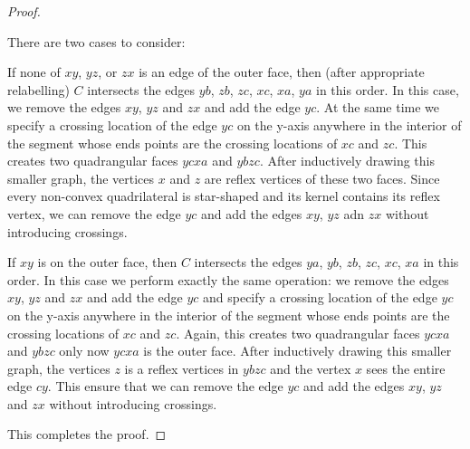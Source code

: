 \documentclass{patmorin}
\begin{document}
\begin{proof}
\begin{enumerate}
        There are two cases to consider: 

        If none of $xy$, $yz$, or $zx$ is an edge of the outer face,
        then (after appropriate relabelling) $C$ intersects the edges
        $yb$, $zb$, $zc$, $xc$, $xa$, $ya$ in this order.  In this case,
        we remove the edges $xy$, $yz$ and $zx$ and add the edge $yc$.
        At the same time we specify a crossing location of the edge
        $yc$ on the y-axis anywhere in the interior of the segment
        whose ends points are the crossing locations of $xc$ and $zc$.
        This creates two quadrangular faces $ycxa$ and $ybzc$.  After
        inductively drawing this smaller graph, the vertices $x$ and $z$
        are reflex vertices of these two faces.  Since every non-convex
        quadrilateral is star-shaped and its kernel contains its reflex
        vertex, we can remove the edge $yc$ and add the edges $xy$, $yz$
        adn $zx$ without introducing crossings.

        If $xy$ is on the outer face, then $C$ intersects the edges
        $ya$, $yb$, $zb$, $zc$, $xc$, $xa$ in this order. In this
        case we perform exactly the same operation:  we remove the
        edges $xy$, $yz$ and $zx$ and add the edge $yc$ and specify a
        crossing location of the edge $yc$ on the y-axis anywhere in
        the interior of the segment whose ends points are the crossing
        locations of $xc$ and $zc$.  Again, this creates two quadrangular
        faces $ycxa$ and $ybzc$ only now $ycxa$ is the outer face.
        After inductively drawing this smaller graph, the vertices $z$
        is a reflex vertices in $ybzc$ and the vertex $x$ sees the entire
        edge $cy$.  This ensure that we can remove the edge $yc$ and
        add the edges $xy$, $yz$ and $zx$ without introducing crossings.
   \end{enumerate}
   This completes the proof.
\end{proof}
\end{document}
